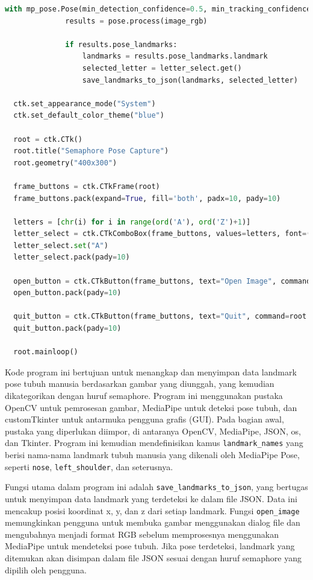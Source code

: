 \documentclass[a4paper,12pt]{article}
\begin{document}
\begin{lstlisting}[language=Python, caption={Kode Program untuk Mendeteksi Landmark Pose}]
          with mp_pose.Pose(min_detection_confidence=0.5, min_tracking_confidence=0.5) as pose:
              results = pose.process(image_rgb)
  
              if results.pose_landmarks:
                  landmarks = results.pose_landmarks.landmark
                  selected_letter = letter_select.get()
                  save_landmarks_to_json(landmarks, selected_letter)
  
  ctk.set_appearance_mode("System")
  ctk.set_default_color_theme("blue")
  
  root = ctk.CTk()
  root.title("Semaphore Pose Capture")
  root.geometry("400x300")
  
  frame_buttons = ctk.CTkFrame(root)
  frame_buttons.pack(expand=True, fill='both', padx=10, pady=10)
  
  letters = [chr(i) for i in range(ord('A'), ord('Z')+1)]
  letter_select = ctk.CTkComboBox(frame_buttons, values=letters, font=("Helvetica", 12), state="readonly")
  letter_select.set("A")
  letter_select.pack(pady=10)
  
  open_button = ctk.CTkButton(frame_buttons, text="Open Image", command=open_image, font=("Helvetica", 14, "bold"), width=200, height=40)
  open_button.pack(pady=10)
  
  quit_button = ctk.CTkButton(frame_buttons, text="Quit", command=root.quit, font=("Helvetica", 14, "bold"), width=200, height=40)
  quit_button.pack(pady=10)
  
  root.mainloop()
\end{lstlisting}

Kode program ini bertujuan untuk menangkap dan menyimpan data landmark pose tubuh manusia berdasarkan gambar yang diunggah, yang kemudian dikategorikan dengan huruf semaphore. Program ini menggunakan pustaka OpenCV untuk pemrosesan gambar, MediaPipe untuk deteksi pose tubuh, dan customTkinter untuk antarmuka pengguna grafis (GUI). Pada bagian awal, pustaka yang diperlukan diimpor, di antaranya OpenCV, MediaPipe, JSON, os, dan Tkinter. Program ini kemudian mendefinisikan kamus \texttt{landmark\_names} yang berisi nama-nama landmark tubuh manusia yang dikenali oleh MediaPipe Pose, seperti \texttt{nose}, \texttt{left\_shoulder}, dan seterusnya.

Fungsi utama dalam program ini adalah \texttt{save\_landmarks\_to\_json}, yang bertugas untuk menyimpan data landmark yang terdeteksi ke dalam file JSON. Data ini mencakup posisi koordinat x, y, dan z dari setiap landmark. Fungsi \texttt{open\_image} memungkinkan pengguna untuk membuka gambar menggunakan dialog file dan mengubahnya menjadi format RGB sebelum memprosesnya menggunakan MediaPipe untuk mendeteksi pose tubuh. Jika pose terdeteksi, landmark yang ditemukan akan disimpan dalam file JSON sesuai dengan huruf semaphore yang dipilih oleh pengguna.
\end{document}
